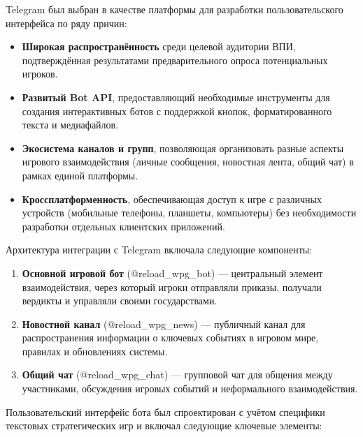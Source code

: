 Telegram был выбран в качестве платформы для разработки пользовательского интерфейса по ряду причин:

\begin{itemize}
    \item \textbf{Широкая распространённость} среди целевой аудитории ВПИ, подтверждённая результатами предварительного опроса потенциальных игроков.

    \item \textbf{Развитый Bot API}, предоставляющий необходимые инструменты для создания интерактивных ботов с поддержкой кнопок, форматированного текста и медиафайлов.

    \item \textbf{Экосистема каналов и групп}, позволяющая организовать разные аспекты игрового взаимодействия (личные сообщения, новостная лента, общий чат) в рамках единой платформы.

    \item \textbf{Кроссплатформенность}, обеспечивающая доступ к игре с различных устройств (мобильные телефоны, планшеты, компьютеры) без необходимости разработки отдельных клиентских приложений.
\end{itemize}

Архитектура интеграции с Telegram включала следующие компоненты:

\begin{enumerate}
    \item \textbf{Основной игровой бот} (@reload\_wpg\_bot) — центральный элемент взаимодействия, через который игроки отправляли приказы, получали вердикты и управляли своими государствами.

    \item \textbf{Новостной канал} (@reload\_wpg\_news) — публичный канал для распространения информации о ключевых событиях в игровом мире, правилах и обновлениях системы.

    \item \textbf{Общий чат} (@reload\_wpg\_chat) — групповой чат для общения между участниками, обсуждения игровых событий и неформального взаимодействия.
\end{enumerate}

Пользовательский интерфейс бота был спроектирован с учётом специфики текстовых стратегических игр и включал следующие ключевые элементы:

